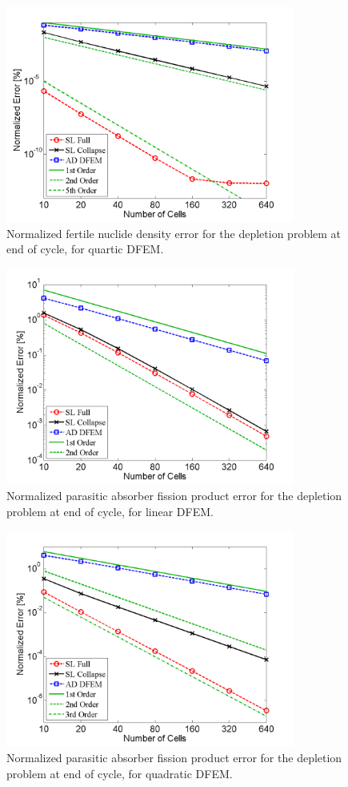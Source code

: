 \begin{figure}[!hbp]
\centering
\includegraphics[width=9.5cm]{chapter5_depletion/ft_P4_norm_err.png}
\caption{Normalized fertile nuclide density error for the depletion problem at end of cycle, for quartic DFEM.}
\label{fig:depletion_NFT_p4}
\end{figure}

\newpage

\begin{figure}[!htp]
\centering
\includegraphics[width=9.5cm]{chapter5_depletion/FPA_P1_norm_err.png}
\caption{Normalized parasitic absorber fission product error for the depletion problem at end of cycle, for linear DFEM.}
\label{fig:depletion_NFPA_p1}
\end{figure}
%
\begin{figure}[!hbp]
\centering
\includegraphics[width=9.5cm]{chapter5_depletion/FPA_P2_norm_err.png}
\caption{Normalized parasitic absorber fission product error for the depletion problem at end of cycle, for quadratic DFEM.}
\label{fig:depletion_NFPA_p2}
\end{figure}

